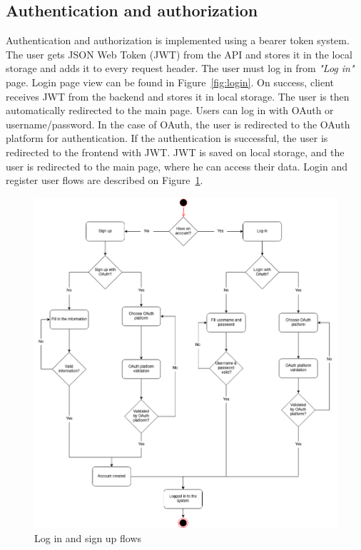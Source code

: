 \subsection{Authentication and authorization}\label{subsec:authentication-and-authorization}
Authentication and authorization is implemented using a bearer token system.
The user gets JSON Web Token (JWT) from the API and stores it in the local storage and adds it to every request header.
The user must log in from \textit{"Log in"} page.
Login page view can be found in Figure~\ref{fig:login}.
On success, client receives JWT from the backend and stores it in local storage.
The user is then automatically redirected to the main page.
Users can log in with OAuth or username/password.
In the case of OAuth, the user is redirected to the OAuth platform for authentication.
If the authentication is successful, the user is redirected to the frontend with JWT.
JWT is saved on local storage, and the user is redirected to the main page, where he can access their data.
Login and register user flows are described on Figure~\ref{fig:login-signup-diagram}.

\begin{figure}[H]
    \includegraphics[width=\textwidth]{figures/login_signup_user_flow}
    \caption{Log in and sign up flows}
    \label{fig:login-signup-diagram}
\end{figure}

